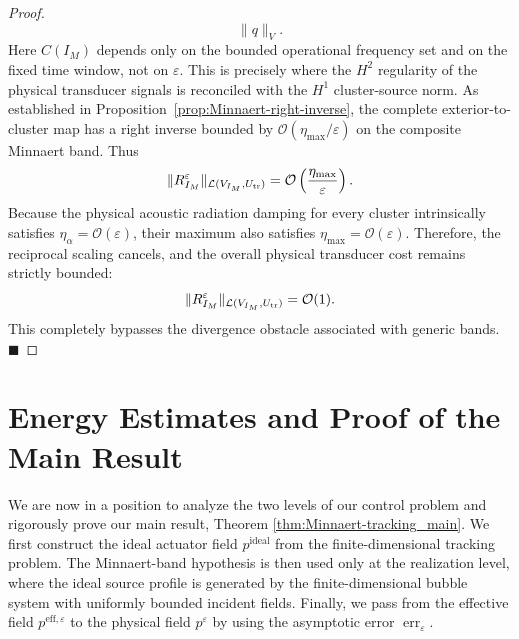 \documentclass[11pt,a4paper]{article}
\numberwithin{equation}{section}
\newcommand{\eps}{\varepsilon}
\begin{document}
\begin{proof}
\[ \|q\|_{V}.
\]
Here $C(I_M)$ depends only on the bounded operational frequency set and on the fixed time window, not on $\varepsilon$. This is precisely where the $H^2$ regularity of the physical transducer signals is reconciled with the $H^1$ cluster-source norm. As established in Proposition~\ref{prop:Minnaert-right-inverse}, the complete exterior-to-cluster map has a right inverse bounded by $\mathcal{O}(\eta_{\max}/\eps)$ on the composite Minnaert band. Thus
\[
 \|R_{I_M}^\eps\|_{\mathcal{L}(V_{I_M},U_{\rm tr})}
 = \mathcal{O}\left(\frac{\eta_{\max}}{\eps}\right).
\]
Because the physical acoustic radiation damping for every cluster intrinsically satisfies $\eta_\alpha = \mathcal{O}(\eps)$, their maximum also satisfies $\eta_{\max} = \mathcal{O}(\eps)$. Therefore, the reciprocal scaling cancels, and the overall physical transducer cost remains strictly bounded: $$\|R_{I_M}^\eps\|_{\mathcal{L}(V_{I_M},U_{\rm tr})}=\mathcal{O}(1).$$ This completely bypasses the divergence obstacle associated with generic bands. \hfill $\blacksquare$
\end{proof}



\section{Energy Estimates and Proof of the Main Result}
\label{sec:proof-main}

\noindent
We are now in a position to analyze the two levels of our control problem and rigorously prove our main result, Theorem \ref{thm:Minnaert-tracking_main}. We first construct the ideal actuator field $p^{\mathrm{ideal}}$ from the finite-dimensional tracking problem. The Minnaert-band hypothesis is then used only at the realization level, where the ideal source profile is generated by the finite-dimensional bubble system with uniformly bounded incident fields. Finally, we pass from the effective field $p^{\mathrm{eff},\varepsilon}$ to the physical field $p^\varepsilon$ by using the asymptotic error $\operatorname{err}_{\varepsilon}$.
\end{document}
